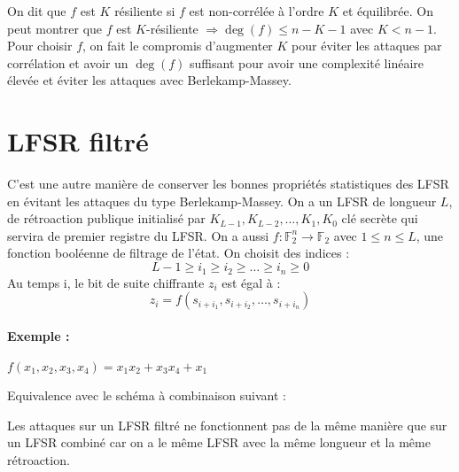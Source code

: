 \documentclass[12pt,a4paper]{report}
\begin{document}
On dit que $f$ est $K$ résiliente si $f$ est non-corrélée à l'ordre $K$ et équilibrée. On peut montrer que $f$ est $K$-résiliente $ \Rightarrow \deg(f) \leqslant n-K-1$ avec $ K < n-1$.\\
Pour choisir $f$, on fait le compromis d'augmenter $K$ pour éviter les attaques par corrélation et avoir un $\deg(f)$ suffisant pour avoir une complexité linéaire élevée et éviter les attaques avec Berlekamp-Massey.

\section{LFSR filtré\\}
C'est une autre manière de conserver les bonnes propriétés statistiques des LFSR en évitant les attaques du type Berlekamp-Massey. On a un LFSR de longueur $L$, de rétroaction publique initialisé par $K_{L-1}, K_{L-2}, \ldots, K_1, K_0$ clé secrète qui servira de premier registre du LFSR. On a aussi $f: \mathbb{F}_2^n \longrightarrow \mathbb{F}_2 $ avec $1 \leqslant n \leqslant L$, une fonction booléenne de filtrage de l'état. On choisit des indices :
$$ L-1 \geqslant i_1 \geqslant i_2 \geqslant \ldots \geqslant i_n \geqslant 0 $$
Au temps i, le bit de suite chiffrante $z_i$ est égal à :
$$ z_i = f(s_{i+i_1}, s_{i+i_2}, \ldots, s_{i+i_n})$$

\begin{figure}[h!]
	\centering
  \scalebox{0.6}{}	
\end{figure}
\paragraph{Exemple :\\}
$f(x_1,x_2,x_3,x_4) = x_1x_2 + x_3x_4 +x_1$\\

\begin{figure}[h!]
	\centering
  \scalebox{0.8}{}	
\end{figure}

Equivalence avec le schéma à combinaison suivant :\\

\begin{figure}[h!]
	\centering
  \scalebox{0.8}{}	
\end{figure}

Les attaques sur un LFSR filtré ne fonctionnent pas de la même manière que sur un LFSR combiné car on a le même LFSR avec la même longueur et la même rétroaction.
\end{document}
